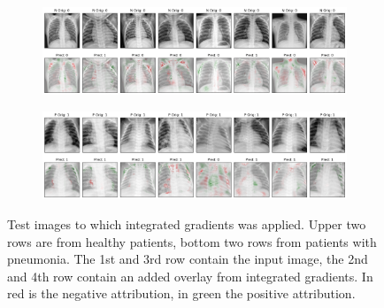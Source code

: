 \begin{figure}
    \centering
    \begin{subfigure}{\columnwidth}
        \includegraphics[width=1\textwidth]{images/IG_test.png}
    \end{subfigure}
    \centering
    \begin{subfigure}{\columnwidth}
        \includegraphics[width=1\textwidth]{images/IG_test_P.png}
    \end{subfigure}
    \caption{Test images to which integrated gradients was applied. Upper two rows are from healthy patients, bottom two rows from patients with pneumonia. The 1st and 3rd row contain the input image, the 2nd and 4th row contain an added overlay from integrated gradients. In red is the negative attribution, in green the positive attribution.}
    \label{fig:ig_test}
\end{figure}